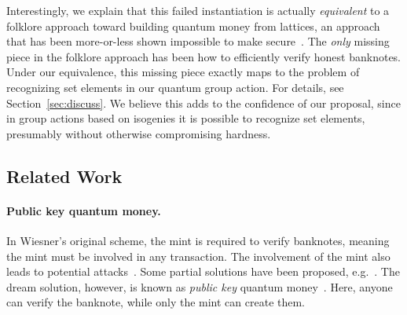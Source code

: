 \documentclass{article}\usepackage[a4paper,margin=20mm]{geometry}
\numberwithin{theorem}{section}
\numberwithin{equation}{section}
\begin{document}
Interestingly, we explain that this failed instantiation is actually \emph{equivalent} to a folklore approach toward building quantum money from lattices, an approach that has been more-or-less shown impossible to make secure~\cite{C:LiuZha19,EC:LiuMonZha23}. The \emph{only} missing piece in the folklore approach has been how to efficiently verify honest banknotes. Under our equivalence, this missing piece exactly maps to the problem of recognizing set elements in our quantum group action. For details, see Section~\ref{sec:discuss}. We believe this adds to the confidence of our proposal, since in group actions based on isogenies it is possible to recognize set elements, presumably without otherwise compromising hardness.




\subsection{Related Work}\label{sec:related}

\paragraph{Public key quantum money.} In Wiesner's original scheme, the mint is required to verify banknotes, meaning the mint must be involved in any transaction. The involvement of the mint also leads to potential attacks~\cite{Lutomirski10}. Some partial solutions have been proposed, e.g.~\cite{EPRINT:BehSat20,AC:RobZha21}. The dream solution, however, is known as \emph{public key} quantum money~\cite{CCC:Aaronson09}. Here, anyone can verify the banknote, while only the mint can create them.
\end{document}
